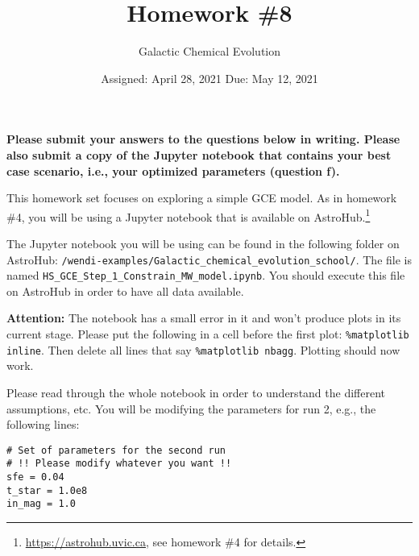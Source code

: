 \documentclass[letterpaper,12pt,twoside=false,DIV=11]{scrartcl}
\newcommand{\topic}{\author}
\begin{document}
\title{Homework \#8}
\topic{Galactic Chemical Evolution}
\date{Assigned: April 28, 2021 \qquad Due: May 12, 2021}

\maketitle
\thispagestyle{fancy}

\textbf{Please submit your answers to the questions below in writing. Please also submit a copy of the Jupyter notebook that contains your best case scenario, i.e., your optimized parameters (question f).}

This homework set focuses on exploring a simple GCE model. As in homework \#4, you will be using a Jupyter notebook that is available on AstroHub.\footnote{\url{https://astrohub.uvic.ca}, see homework \#4 for details.} 

The Jupyter notebook you will be using can be found in the following folder on AstroHub: \texttt{/wendi-examples/Galactic\_chemical\_evolution\_school/}. The file is named \texttt{HS\_GCE\_Step\_1\_Constrain\_MW\_model.ipynb}. You should execute this file on AstroHub in order to have all data available.

\textbf{Attention:} The notebook has a small error in it and won't produce plots in its current stage. Please put the following in a cell before the first plot: \texttt{\%matplotlib inline}. Then delete all lines that say \texttt{\%matplotlib nbagg}. Plotting should now work.

Please read through the whole notebook in order to understand the different assumptions, etc. You will be modifying the parameters for run 2, e.g., the following lines:

\lstset{language=Python}
\begin{lstlisting}
# Set of parameters for the second run
# !! Please modify whatever you want !!
sfe = 0.04
t_star = 1.0e8
in_mag = 1.0
\end{lstlisting}
\end{document}
